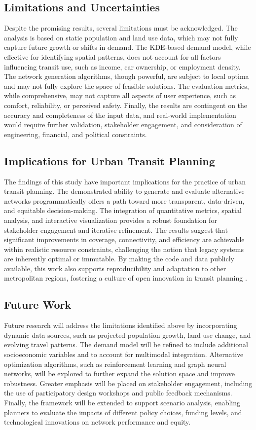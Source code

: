 \documentclass[manuscript,screen,review]{acmart}
\begin{document}
\subsection{Limitations and Uncertainties}
Despite the promising results, several limitations must be acknowledged. The analysis is based on static population and land use data, which may not fully capture future growth or shifts in demand. The KDE-based demand model, while effective for identifying spatial patterns, does not account for all factors influencing transit use, such as income, car ownership, or employment density. The network generation algorithms, though powerful, are subject to local optima and may not fully explore the space of feasible solutions. The evaluation metrics, while comprehensive, may not capture all aspects of user experience, such as comfort, reliability, or perceived safety. Finally, the results are contingent on the accuracy and completeness of the input data, and real-world implementation would require further validation, stakeholder engagement, and consideration of engineering, financial, and political constraints.

\subsection{Implications for Urban Transit Planning}
The findings of this study have important implications for the practice of urban transit planning. The demonstrated ability to generate and evaluate alternative networks programmatically offers a path toward more transparent, data-driven, and equitable decision-making. The integration of quantitative metrics, spatial analysis, and interactive visualization provides a robust foundation for stakeholder engagement and iterative refinement. The results suggest that significant improvements in coverage, connectivity, and efficiency are achievable within realistic resource constraints, challenging the notion that legacy systems are inherently optimal or immutable. By making the code and data publicly available, this work also supports reproducibility and adaptation to other metropolitan regions, fostering a culture of open innovation in transit planning \cite{bib:bast2016route, bib:chien2001genetic}.

\subsection{Future Work}
Future research will address the limitations identified above by incorporating dynamic data sources, such as projected population growth, land use change, and evolving travel patterns. The demand model will be refined to include additional socioeconomic variables and to account for multimodal integration. Alternative optimization algorithms, such as reinforcement learning and graph neural networks, will be explored to further expand the solution space and improve robustness. Greater emphasis will be placed on stakeholder engagement, including the use of participatory design workshops and public feedback mechanisms. Finally, the framework will be extended to support scenario analysis, enabling planners to evaluate the impacts of different policy choices, funding levels, and technological innovations on network performance and equity.
\end{document}
